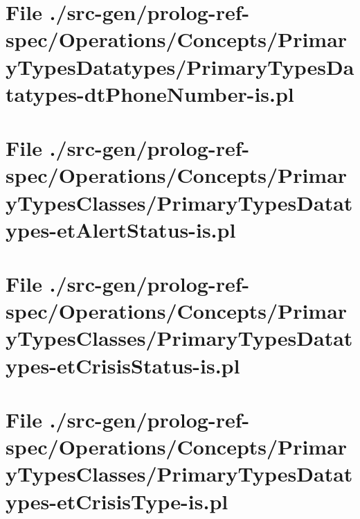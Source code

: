 \section[File /src-gen/prolog-ref-spec.../PrimaryTypesDatatypes-dtPhoneNumber-is.pl]{File ./src-gen/prolog-ref-spec/Operations/Concepts/PrimaryTypesDatatypes/PrimaryTypesDatatypes-dtPhoneNumber-is.pl}
\scriptsize

\normalsize
	
\section[File /src-gen/prolog-ref-spec.../PrimaryTypesDatatypes-etAlertStatus-is.pl]{File ./src-gen/prolog-ref-spec/Operations/Concepts/PrimaryTypesClasses/PrimaryTypesDatatypes-etAlertStatus-is.pl}
\scriptsize

\normalsize
	
\section[File /src-gen/prolog-ref-spec.../PrimaryTypesDatatypes-etCrisisStatus-is.pl]{File ./src-gen/prolog-ref-spec/Operations/Concepts/PrimaryTypesClasses/PrimaryTypesDatatypes-etCrisisStatus-is.pl}
\scriptsize

\normalsize
	
\section[File /src-gen/prolog-ref-spec.../PrimaryTypesDatatypes-etCrisisType-is.pl]{File ./src-gen/prolog-ref-spec/Operations/Concepts/PrimaryTypesClasses/PrimaryTypesDatatypes-etCrisisType-is.pl}
\scriptsize

\normalsize
	
